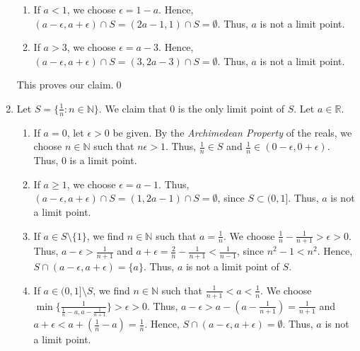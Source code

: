 \documentclass[10pt]{article}
\begin{document}
\begin{enumerate}
\begin{enumerate}
                        \item If $a < 1$, we choose $\epsilon = 1 - a$. Hence, $(a - \epsilon, a + \epsilon) \cap S = 
                        (2a - 1, 1) \cap S = \emptyset$. Thus, $a$ is not a limit point.

                        \item If $a > 3$, we choose $\epsilon = a - 3$. Hence, $(a - \epsilon, a + \epsilon) \cap S =
                        (3, 2a - 3) \cap S = \emptyset$. Thus, $a$ is not a limit point.
                \end{enumerate}
                This proves our claim.\qed

                \item Let $S = \{\frac{1}{n}: n \in \mathbb{N}\}$. We claim that $0$ is the only limit point of $S$.
                Let $a \in \mathbb{R}$.
                \begin{enumerate}
                        \item If $a = 0$, let $\epsilon > 0$ be given. By the \emph{Archimedean Property} of the reals,
                        we choose $n \in \mathbb{N}$ such that $n\epsilon > 1$. Thus, $\frac{1}{n} \in S$ and
                        $\frac{1}{n} \in (0 - \epsilon, 0 + \epsilon)$. Thus, $0$ is a limit point.

                        \item If $a \ge 1$, we choose $\epsilon = a - 1$. Thus, $(a - \epsilon, a + \epsilon) \cap S = 
                        (1, 2a - 1) \cap S = \emptyset$, since $S \subset (0, 1]$. Thus, $a$ is not a limit point.

                        \item If $a \in S\setminus\{1\}$, we find $n \in \mathbb{N}$ such that $a = \frac{1}{n}$. We choose
                        $\frac{1}{n} - \frac{1}{n+1} > \epsilon > 0$. Thus, $a - \epsilon > \frac{1}{n+1}$ and
                        $a + \epsilon = \frac{2}{n} - \frac{1}{n+1} < \frac{1}{n-1}$, since $n^2 - 1 < n^2$.
                        Hence, $S \cap (a - \epsilon, a + \epsilon) = \{a\}$.
                        Thus, $a$ is not a limit point of $S$.

                        \item If $a \in (0, 1]\setminus S$, we find $n \in \mathbb{N}$ such that $\frac{1}{n+1} < a < \frac{1}{n}$.
                        We choose $\min\{\frac{1}{\frac{1}{n} - a, a - \frac{1}{n + 1}}\} > \epsilon > 0$.
                        Thus, $a - \epsilon > a - (a - \frac{1}{n+1}) = \frac{1}{n+1}$ and $a + \epsilon < a + (\frac{1}{n} - a) = \frac{1}{n}$.
                        Hence, $S \cap (a - \epsilon, a + \epsilon) = \emptyset$. Thus, $a$ is not a limit point.
                        

\end{enumerate}
\end{enumerate}
\end{document}
